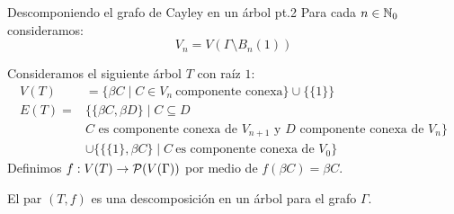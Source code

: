 \documentclass[aspectratio=169, 11pt]{beamer}
\begin{document}
	\begin{frame}[fragile]{Descomponiendo el grafo de Cayley en un árbol pt.2}
		Para cada $n \in \mathbb{N}_{0}$ consideramos:
		\[
			V_{n} = V(\Gamma \setminus B_{n}(1))	
		\]

		Consideramos el siguiente árbol $T$ con raíz $1$:
		\begin{align*}
			V(T)  & = \{ \beta C \mid C \in V_{n} \ \text{componente conexa} \}  \cup \{ \{1\} \} \\
			E(T)  =  & \{ \{ \beta C, \beta D \}  \mid C \subseteq D \\ 
			& \text{$C$ es componente conexa de $V_{n+1}$ y $D$ componente conexa de $V_{n}$} \} \\
			& \cup \{ \{\{1\}, \beta C\} \mid C \ \text{es componente conexa de $V_{0}$} \}
		\end{align*}
		Definimos $f: V(T) \to {\cal{P}}(V(\Gamma))$ por medio de $f(\beta C) = \beta C$.
		\begin{lema}
			El par $(T,f)$ es una descomposición en un árbol para el grafo $\Gamma$.
		\end{lema}
	\end{frame}
\end{document}

